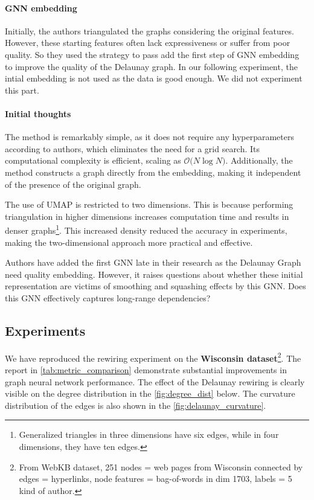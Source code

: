 \documentclass{article}
\theoremstyle{plain}
\theoremstyle{definition}
\theoremstyle{remark}
\begin{document}
\paragraph{GNN embedding}
Initially, the authors triangulated the graphs considering the original 
features. However, these starting features often lack
expressiveness or suffer from poor quality. So they used the strategy to pass
add the first step of GNN embedding to improve the quality of the Delaunay graph.
In our following experiment, the intial embedding is not used as the data 
is good enough. We did not experiment this part.





\paragraph{Initial thoughts}
The method is remarkably simple, as it does not require any hyperparameters according to authors, 
which eliminates the need for a grid search. Its computational complexity is 
efficient, scaling as $\mathcal{O} \big( N \log N \big)$. 
Additionally, the method constructs a graph directly from the embedding, 
making it independent of the presence of the original graph.

The use of UMAP is restricted to two dimensions. This is because performing 
triangulation in higher dimensions increases computation time and 
results in denser graphs\footnote{Generalized triangles in three dimensions
 have six edges, while in four dimensions, they have ten edges.}. 
This increased density reduced the accuracy in experiments, making the two-dimensional approach more practical and effective.

Authors have added the first GNN late in their research as the Delaunay Graph 
need quality embedding. However, it raises questions about whether these initial
representation are victims of smoothing and squashing effects by this GNN.
Does this GNN effectively captures long-range dependencies?


\subsection{Experiments}
We have reproduced the rewiring experiment on the \textbf{Wisconsin dataset}\footnote{
From WebKB dataset, 251 nodes = web pages from Wisconsin connected
by edges = hyperlinks, node features = bag-of-words in dim 1703, labels =  5 kind of author.}.
The report in \cref{tab:metric_comparison} demonstrate substantial improvements in graph neural network performance. The effect
of the Delaunay rewiring is clearly visible on the degree distribution in the \cref{fig:degree_dist} below.
The curvature distribution of the edges is also shown in the \cref{fig:delaunay_curvature}.
\end{document}
